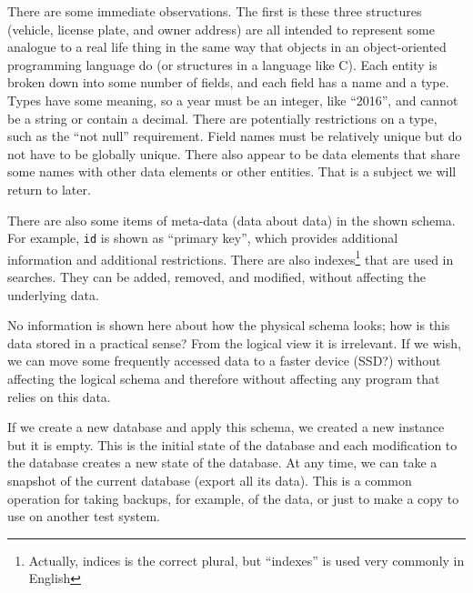 \documentclass[a4paper]{report}
\begin{document}
There are some immediate observations. The first is these three structures (vehicle, license plate, and owner address) are all intended to represent some analogue to a real life thing in the same way that objects in an object-oriented programming language do (or structures in a language like C). Each entity is broken down into some number of fields, and each field has a name and a type. Types have some meaning, so a year must be an integer, like ``2016'', and cannot be a string or contain a decimal. There are potentially restrictions on a type, such as the ``not null'' requirement. Field names must be relatively unique but do not have to be globally unique. There also appear to be data elements that share some names with other data elements or other entities. That is a subject we will return to later.

There are also some items of meta-data (data about data) in the shown schema. For example, \texttt{id} is shown as ``primary key'', which provides additional information and additional restrictions. There are also indexes\footnote{Actually, indices is the correct plural, but ``indexes'' is used very commonly in English} that are used in searches. They can be added, removed, and modified, without affecting the underlying data.

No information is shown here about how the physical schema looks; how is this data stored in a practical sense? From the logical view it is irrelevant. If we wish, we can move some frequently accessed data to a faster device (SSD?) without affecting the logical schema and therefore without affecting any program that relies on this data. 

If we create a new database and apply this schema, we created a new instance but it is empty. This is the initial state of the database and each modification to the database creates a new state of the database. At any time, we can take a snapshot of the current database (export all its data). This is a common operation for taking backups, for example, of the data, or just to make a copy to use on another test system.
\end{document}
